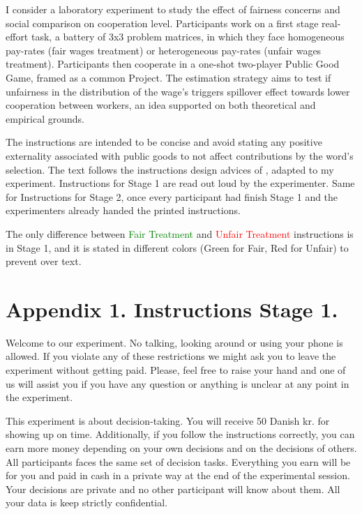 \documentclass[a4paper, 12pt]{article}
\begin{document}
I consider a laboratory experiment to study the effect of fairness concerns and social comparison on cooperation level. Participants work on a first stage real-effort task, a battery of 3x3 problem matrices, in which they face homogeneous pay-rates (fair wages treatment) or heterogeneous pay-rates (unfair wages treatment). Participants then cooperate in a one-shot two-player Public Good Game, framed as a common Project. The estimation strategy aims to test if unfairness in the distribution of the wage's triggers spillover effect towards lower cooperation between workers, an idea supported on both theoretical and empirical grounds. 
\begin{appendices}

The instructions are intended to be concise and avoid stating any positive externality associated with public goods to not affect contributions by the word’s selection. The text follows the instructions design advices of \cite{Ramalingam2016}, adapted to my experiment. Instructions for Stage 1 are read out loud by the experimenter. Same for Instructions for Stage 2, once every participant had finish Stage 1 and the experimenters already handed the printed instructions.

The only difference between \textcolor{Green}{Fair Treatment} and \textcolor{Red}{Unfair Treatment} instructions is in Stage 1, and it is stated in different colors (Green for Fair, Red for Unfair) to prevent over text.

\chapter{\textbf{Appendix 1. Instructions Stage 1.}}

Welcome to our experiment. No talking, looking around or using your phone is allowed. If you violate any of these restrictions we might ask you to leave the experiment without getting paid. Please, feel free to raise your hand and one of us will assist you if you have any question or anything is unclear at any point in the experiment. 

This experiment is about decision-taking. You will receive 50 Danish kr. for showing up on time. Additionally, if you follow the instructions correctly, you can earn more money depending on your own decisions and on the decisions of others. All participants faces the same set of decision tasks. Everything you earn will be for you and paid in cash in a private way at the end of the experimental session. Your decisions are private and no other participant will know about them. All your data is keep strictly confidential.


\end{appendices}
\end{document}
